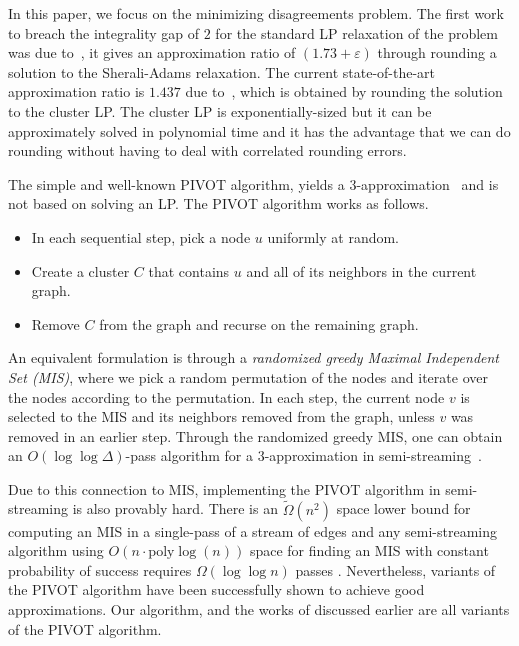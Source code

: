 \documentclass[10pt,a4paper]{article}
\newcommand{\poly}{\mathrm{poly}}
\newcommand{\pivot}{\textrm{PIVOT}\xspace}
\newcommand{\eps}{\ensuremath{\varepsilon}}
\begin{document}
In this paper, we focus on the minimizing disagreements problem. The first work to breach the integrality gap of $2$ for the standard LP relaxation of the problem was due to~\cite{cohen2022correlation,Cohen-AddadLLN2023}, it gives an approximation ratio of $(1.73+\eps)$ through rounding a solution to the Sherali-Adams relaxation. 
The current state-of-the-art approximation ratio is $1.437$ due to~\cite{DBLP:conf/stoc/CaoCL0NV24}, which is obtained by rounding the solution to the cluster LP. The cluster LP is exponentially-sized but it can be approximately solved in polynomial time and it has the advantage that we can do rounding without having to deal with correlated rounding errors.

The simple and well-known \pivot algorithm, yields a $3$-approximation~\cite{ailon2008aggregating} and is not based on solving an LP.
The \pivot algorithm works as follows.
\begin{itemize}
    \item In each sequential step, pick a node $u$ uniformly at random.
    \item Create a cluster $C$ that contains $u$ and all of its neighbors in the current graph.
    \item Remove $C$ from the graph and recurse on the remaining graph.
\end{itemize}
An equivalent formulation is through a \emph{randomized greedy Maximal Independent Set (MIS)}, where we pick a random permutation of the nodes and iterate over the nodes according to the permutation. In each step, the current node $v$ is selected to the MIS and its neighbors removed from the graph, unless $v$ was removed in an earlier step.
Through the randomized greedy MIS, one can obtain an $O(\log \log \Delta)$-pass algorithm for a $3$-approximation in semi-streaming~\cite{ahn2015correlation}.

Due to this connection to MIS, implementing the PIVOT algorithm in semi-streaming is also provably hard. There is an $\widetilde{\Omega}(n^2)$ space lower bound for computing an MIS in a single-pass of a stream of edges \cite{cormodeDK2019} and any semi-streaming algorithm using $O(n\cdot \poly\log(n))$ space for finding an MIS with constant probability of success requires $\Omega(\log\log n)$ passes \cite{AssadiKNS2024}. Nevertheless, variants of the PIVOT algorithm have been successfully shown to achieve good approximations. Our algorithm, and the works of \cite{Behnezhad2022,behnezhad2023single,chakrabarty2023singlepass} discussed earlier are all variants of the PIVOT algorithm.
\end{document}
